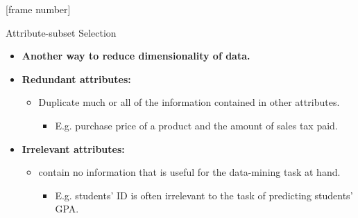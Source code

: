 \documentclass[aspectratio=169,t]{beamer}
\begin{document}
  {
    [frame number]
    \begin{frame}{Attribute-subset Selection}
    \begin{itemize}
      \item \textbf{Another way to reduce dimensionality of data.}
      \item\textbf{\color{airforceblue}Redundant attributes:}
      \begin{itemize}
        \item Duplicate much or all of the information contained in other attributes.
        \begin{itemize}
          \item E.g. purchase price of a product and the amount of sales tax paid.
        \end{itemize}
      \end{itemize}
      \item \textbf{\color{airforceblue}Irrelevant attributes:}
      \begin{itemize}
        \item contain no information that is useful for the data-mining task at hand.
        \begin{itemize}
          \item E.g. students' ID is often irrelevant to the task of predicting students' GPA.
        \end{itemize}
      \end{itemize}
    \end{itemize}
    \end{frame}
  }
\end{document}
